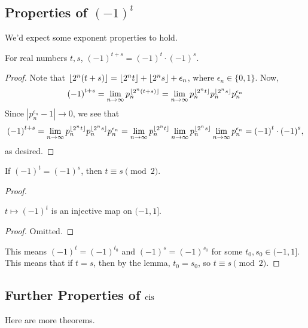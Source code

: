 \subsection{Properties of \texorpdfstring{$(-1)^t$}{-1 to a power}}

We'd expect some exponent properties to hold.

\begin{theorem}
    For real numbers $t,s$, ${(-1)}^{t+s} = {(-1)}^{t}\cdot {(-1)}^{s}$.
\end{theorem}

\begin{proof}
    Note that $\left \lfloor{2^n(t+s)}\right \rfloor = \left \lfloor{2^n t}\right \rfloor + \left \lfloor{2^n s}\right \rfloor + \epsilon_n$, 
    where $\epsilon_n \in \{0,1\}$.
    Now,
    \[ {(-1)}^{t+s} = \lim_{n \to \infty} p_n^{\left \lfloor{2^n(t+s)}\right \rfloor} = \lim_{n \to \infty} p_n^{\left \lfloor{2^n t}\right \rfloor} p_n^{\left \lfloor{2^n s}\right \rfloor} p_n^{\epsilon_n} \]
    Since $|p_n^{\epsilon_n} -1| \to 0$, we see that
    \[ {(-1)}^{t+s} = \lim_{n \to \infty} p_n^{\left \lfloor{2^n t}\right \rfloor} p_n^{\left \lfloor{2^n s}\right \rfloor} p_n^{\epsilon_n} = \lim_{n \to \infty} p_n^{\left \lfloor{2^n t}\right \rfloor}  \lim_{n \to \infty} p_n^{\left \lfloor{2^n s}\right \rfloor} \lim_{n \to \infty} p_n^{\epsilon_n} = {(-1)}^{t}\cdot {(-1)}^{s}, \]
    as desired.
\end{proof}

\begin{theorem}
    If $(-1)^t = (-1)^s$, then $t \equiv s \pmod{2}$.
\end{theorem}

\begin{proof}
    \begin{lemma}
        $t \mapsto (-1)^t$ is an injective map on $(-1, 1]$.
    \end{lemma}

    \begin{proof}
        Omitted.
    \end{proof}

    This means $(-1)^t = (-1)^{t_0}$ and $(-1)^s = (-1)^{s_0}$
    for some $t_0, s_0 \in (-1, 1]$.
    This means that if $t = s$, then by the lemma, $t_0 = s_0$,
    so $t \equiv s \pmod{2}$.
    
\end{proof}

\subsection{Further Properties of \texorpdfstring{$\operatorname{cis}$}{cis}}

Here are more theorems.

